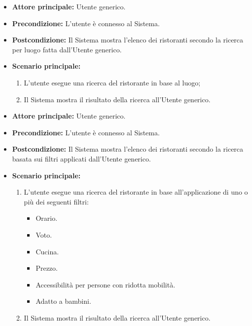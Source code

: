\label{usecase:Ricerca ristoranti per luogo}
\begin{itemize}
	\item \textbf{Attore principale:} Utente generico.

	\item \textbf{Precondizione:} L'utente è connesso al Sistema.

	\item \textbf{Postcondizione:} Il Sistema mostra l'elenco dei ristoranti secondo la ricerca per luogo fatta dall'Utente generico.

	\item \textbf{Scenario principale:}
	      \begin{enumerate}
		      \item L'utente esegue una ricerca del ristorante in base al luogo;
		      \item Il Sistema mostra il risultato della ricerca all'Utente generico.
	      \end{enumerate}
\end{itemize}


\label{usecase:Ricerca ristoranti per filtri}
\begin{itemize}
	\item \textbf{Attore principale:} Utente generico.

	\item \textbf{Precondizione:} L'utente è connesso al Sistema.

	\item \textbf{Postcondizione:} Il Sistema mostra l'elenco dei ristoranti secondo la ricerca basata sui filtri applicati dall'Utente generico.

	\item \textbf{Scenario principale:}
	      \begin{enumerate}
		      \item L'utente esegue una ricerca del ristorante in base all'applicazione di uno o più dei seguenti filtri:
		            \begin{itemize}
			            \item Orario.
			            \item Voto.
			            \item Cucina.
			            \item Prezzo.
			            \item Accessibilità per persone con ridotta mobilità.
			            \item Adatto a bambini.
		            \end{itemize}
		      \item Il Sistema mostra il risultato della ricerca all'Utente generico.
	      \end{enumerate}
\end{itemize}
